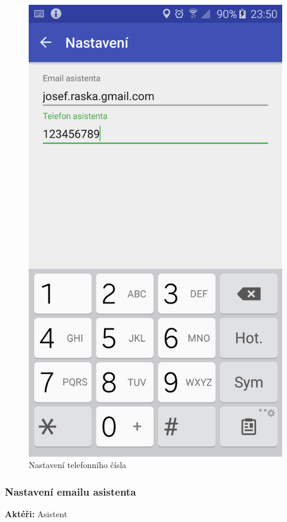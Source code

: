\documentclass[czech,master,public,dept460,male,java,cpdeclaration]{diploma}
\newcommand{\usecase}[2]{\subsubsection{#1}\label{#2}}
\begin{document}
\begin{figure}[H]
\begin{minipage}{.5\textwidth}
\centering
                \includegraphics[scale=0.14]{img/screen/nastaveniasistent.png}
        \caption{Nastavení telefonního čísla}
        \label{fig:nastavenicisla}
    \end{minipage}
\end{figure}

\usecase{Nastavení emailu asistenta}{nastaveniemailu}
\textbf{Aktéři:} Asistent
\end{document}
